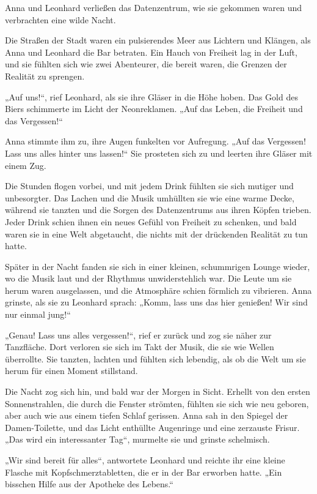 \documentclass[
]{article}
\begin{document}
Anna und Leonhard verließen das Datenzentrum, wie sie gekommen waren und
verbrachten eine wilde Nacht.

Die Straßen der Stadt waren ein pulsierendes Meer aus Lichtern und
Klängen, als Anna und Leonhard die Bar betraten. Ein Hauch von Freiheit
lag in der Luft, und sie fühlten sich wie zwei Abenteurer, die bereit
waren, die Grenzen der Realität zu sprengen.

„Auf uns!{\kern0pt}``, rief Leonhard, als sie ihre Gläser in die Höhe
hoben. Das Gold des Biers schimmerte im Licht der Neonreklamen. „Auf das
Leben, die Freiheit und das Vergessen!{\kern0pt}``

Anna stimmte ihm zu, ihre Augen funkelten vor Aufregung. „Auf das
Vergessen! Lass uns alles hinter uns lassen!{\kern0pt}`` Sie prosteten
sich zu und leerten ihre Gläser mit einem Zug.

Die Stunden flogen vorbei, und mit jedem Drink fühlten sie sich mutiger
und unbesorgter. Das Lachen und die Musik umhüllten sie wie eine warme
Decke, während sie tanzten und die Sorgen des Datenzentrums aus ihren
Köpfen trieben. Jeder Drink schien ihnen ein neues Gefühl von Freiheit
zu schenken, und bald waren sie in eine Welt abgetaucht, die nichts mit
der drückenden Realität zu tun hatte.

Später in der Nacht fanden sie sich in einer kleinen, schummrigen Lounge
wieder, wo die Musik laut und der Rhythmus unwiderstehlich war. Die
Leute um sie herum waren ausgelassen, und die Atmosphäre schien förmlich
zu vibrieren. Anna grinste, als sie zu Leonhard sprach: „Komm, lass uns
das hier genießen! Wir sind nur einmal jung!{\kern0pt}``

„Genau! Lass uns alles vergessen!{\kern0pt}``, rief er zurück und zog
sie näher zur Tanzfläche. Dort verloren sie sich im Takt der Musik, die
sie wie Wellen überrollte. Sie tanzten, lachten und fühlten sich
lebendig, als ob die Welt um sie herum für einen Moment stillstand.

Die Nacht zog sich hin, und bald war der Morgen in Sicht. Erhellt von
den ersten Sonnenstrahlen, die durch die Fenster strömten, fühlten sie
sich wie neu geboren, aber auch wie aus einem tiefen Schlaf gerissen.
Anna sah in den Spiegel der Damen-Toilette, und das Licht enthüllte
Augenringe und eine zerzauste Frisur. „Das wird ein interessanter Tag``,
murmelte sie und grinste schelmisch.

„Wir sind bereit für alles``, antwortete Leonhard und reichte ihr eine
kleine Flasche mit Kopfschmerztabletten, die er in der Bar erworben
hatte. „Ein bisschen Hilfe aus der Apotheke des Lebens.``
\end{document}
